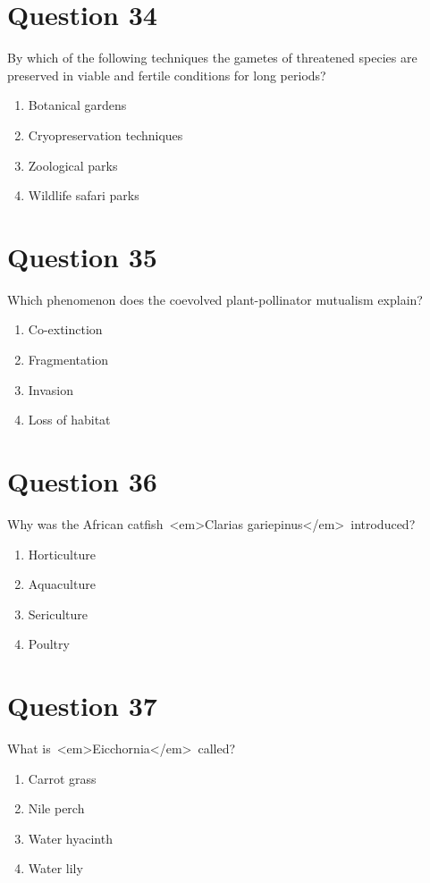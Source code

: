 \documentclass{article}
\begin{document}
\section*{Question 34}
By which of the following techniques the gametes of threatened species are preserved in viable and fertile conditions for long periods?\newline
\begin{enumerate}[label=(\alph*)]
\item Botanical gardens
\item Cryopreservation techniques
\item Zoological parks
\item Wildlife safari parks
\end{enumerate}
\newpage
\section*{Question 35}
Which phenomenon does the coevolved plant-pollinator mutualism explain?\newline
\begin{enumerate}[label=(\alph*)]
\item Co-extinction
\item Fragmentation
\item Invasion
\item Loss of habitat
\end{enumerate}
\newpage
\section*{Question 36}
Why was the African catfish <em>Clarias gariepinus</em> introduced?\newline
\begin{enumerate}[label=(\alph*)]
\item Horticulture
\item Aquaculture
\item Sericulture
\item Poultry
\end{enumerate}
\newpage
\section*{Question 37}
What is <em>Eicchornia</em> called?\newline
\begin{enumerate}[label=(\alph*)]
\item Carrot grass
\item Nile perch
\item Water hyacinth
\item Water lily
\end{enumerate}
\newpage
\end{document}
